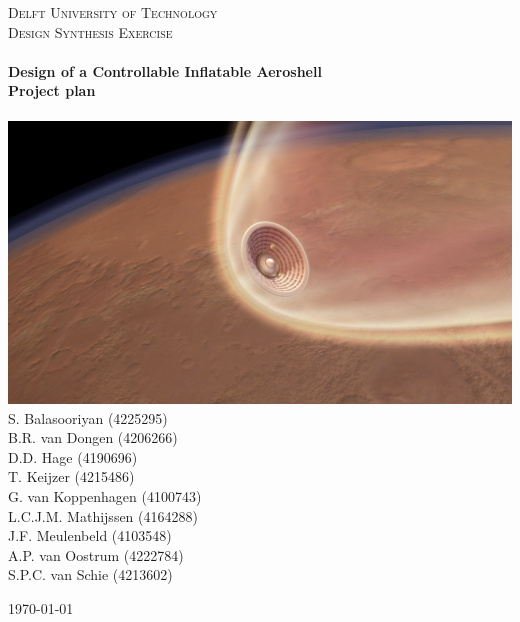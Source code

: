\begin{titlepage}
\begin{center}

\textsc{\LARGE Delft University of Technology}\\[0.3cm]
\textsc{\Large Design Synthesis Exercise}\\[0.5cm]

\HRule \\[0.4cm]
{\Large \bfseries Design of a Controllable Inflatable Aeroshell}\\[0.2cm]
{\Huge \bfseries Project plan}\\[0.2cm]
\HRule \\[1.2cm]

\includegraphics[scale=0.4]{./Titlepage/coverpicture}\\[1cm]

S. Balasooriyan (4225295) \\
B.R. van Dongen (4206266) \\
D.D. Hage (4190696) \\
T. Keijzer (4215486) \\
G. van Koppenhagen (4100743) \\
L.C.J.M. Mathijssen (4164288) \\
J.F. Meulenbeld (4103548) \\
A.P. van Oostrum (4222784) \\
S.P.C. van Schie (4213602) \\




\vfill

\begin{large}\today \end{large}

\end{center}
\end{titlepage}